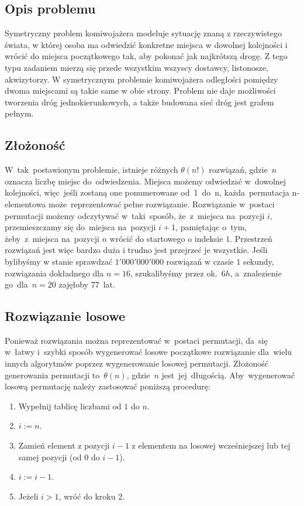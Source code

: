 \subsection{Opis problemu}

Symetryczny problem komiwojażera modeluje sytuację znaną z rzeczywistego świata, w której osoba ma odwiedzić konkretne miejsca w dowolnej kolejności i wrócić do miejsca początkowego tak, aby pokonać jak najkrótszą drogę. Z tego typu zadaniem mierzą się przede wszystkim wszyscy dostawcy, listonosze, akwizytorzy. W symetrycznym problemie komiwojażera odległości pomiędzy dwoma miejscami są takie same w obie strony. Problem nie daje możliwości tworzenia dróg jednokierunkowych, a także budowana sieć dróg jest grafem pełnym.

\subsection{Złożoność}

W~tak~postawionym problemie, istnieje różnych $\theta(n!)$ rozwiązań, gdzie~$n$ oznacza liczbę miejsc do~odwiedzenia. Miejsca możemy odwiedzać w~dowolnej kolejności, więc~jeśli zostaną one ponumerowane od~1~do~n, każda~permutacja n-elementowa może~reprezentować pełne rozwiązanie. Rozwiązanie w~postaci permutacji możemy odczytywać w~taki~sposób, że~z~miejsca na~pozycji $i$, przemieszczamy się do~miejsca na~pozycji $i+1$, pamiętając o~tym, żeby~z~miejsca na~pozycji $n$ wrócić do startowego o indeksie $1$. Przestrzeń rozwiązań jest więc bardzo duża i trudno jest przejrzeć je wszystkie. Jeśli bylibyśmy w stanie sprawdzać $1'000'000'000$ rozwiązań w czasie $1$ sekundy, rozwiązania dokładnego dla $n=16$, szukalibyśmy przez ok.~$6h$, a~znalezienie go~dla~$n=20$ zajęłoby $77$~lat.

\subsection{Rozwiązanie losowe}

Ponieważ rozwiązania można reprezentować w~postaci permutacji, da~się w~łatwy i~szybki sposób wygenerować losowe początkowe rozwiązanie dla~wielu innych algorytmów poprzez wygenerowanie losowej permutacji. Złożoność generowania permutacji to~$\theta(n)$, gdzie~$n$ jest~jej~długością. Aby~wygenerować losową permutację należy zastosować poniższą procedurę:

\begin{enumerate}
    \item Wypełnij tablicę liczbami od $1$ do $n$.
    \item $i := n$.
    \item Zamień element z pozycji $i-1$ z elementem na losowej wcześniejszej lub tej samej pozycji (od $0$ do $i-1$).
    \item $i := i-1$.
    \item Jeżeli $i>1$, wróć do kroku 2.
\end{enumerate}

